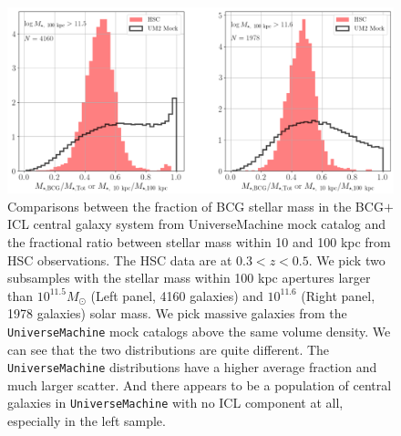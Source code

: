 \documentclass[a4paper,fleqn,usenatbib]{mnras}
\def\um{\texttt{UniverseMachine}}
\begin{document}
    \begin{figure}
        \centering 
        \includegraphics[width=\textwidth]{fig/um2_mbcg_mtot_frac}
            \caption{
                Comparisons between the fraction of BCG stellar mass in the BCG$+$ICL 
                central galaxy system from UniverseMachine mock catalog and the 
                fractional ratio between stellar mass within 10 and 100 kpc from HSC 
                observations.  
                The HSC data are at $0.3 < z < 0.5$.  
                We pick two subsamples with the stellar mass within 100 kpc apertures 
                larger than $10^{11.5} M_{\odot}$ (Left panel, 4160 galaxies) and 
                $10^{11.6}$ (Right panel, 1978 galaxies) solar mass.  
                We pick massive galaxies from the \um{} mock catalogs above the same 
                volume density.  
                We can see that the two distributions are quite different.  
                The \um{} distributions have a higher average fraction and much 
                larger scatter.  
                And there appears to be a population of central galaxies in \um{} with 
                no ICL component at all, especially in the left sample.
                }
        \label{fig:um2_m100_m10_4}
    \end{figure}

\bsp
\label{lastpage}
\end{document}

